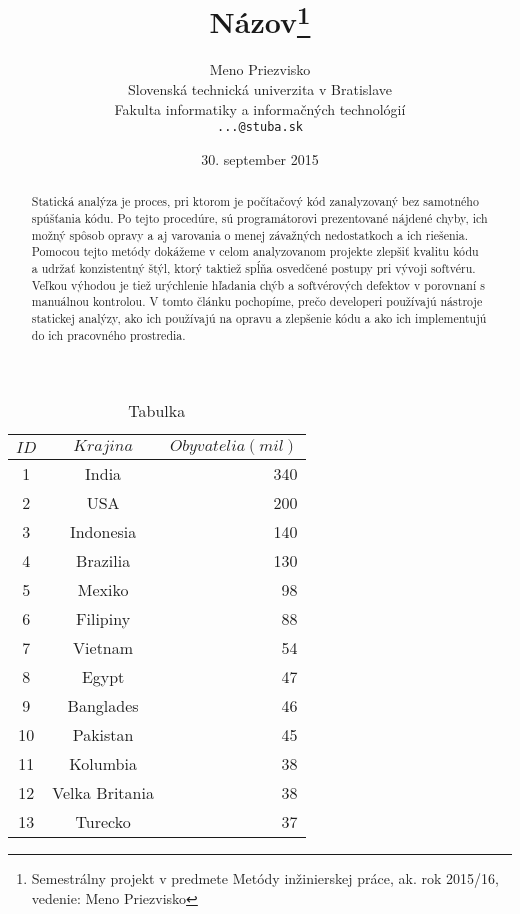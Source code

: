 \documentclass[10pt,twoside,slovak,a4paper]{article}
\title{Názov\thanks{Semestrálny projekt v predmete Metódy inžinierskej práce, ak. rok 2015/16, vedenie: Meno Priezvisko}} %
\author{Meno Priezvisko\\[2pt]
	{\small Slovenská technická univerzita v Bratislave}\\
	{\small Fakulta informatiky a informačných technológií}\\
	{\small \texttt{...@stuba.sk}}
	}
\date{\small 30. september 2015} %
\begin{document}
\maketitle

\begin{abstract}
	Statická analýza je proces, pri ktorom je počítačový kód zanalyzovaný bez samotného spúšťania kódu.
	Po tejto procedúre, sú programátorovi prezentované nájdené chyby, ich možný spôsob opravy a aj varovania
	o menej závažných nedostatkoch a ich riešenia. Pomocou tejto metódy dokážeme v celom analyzovanom projekte
	zlepšiť kvalitu kódu a udržať konzistentný štýl, ktorý taktiež spĺňa osvedčené postupy pri vývoji softvéru.
	Veľkou výhodou je tiež urýchlenie hľadania chýb a softvérových defektov v porovnaní s manuálnou kontrolou.
	V tomto článku pochopíme, prečo developeri používajú nástroje statickej analýzy, ako ich používajú
	na opravu a zlepšenie kódu a ako ich implementujú do ich pracovného prostredia.~\cite{Main}
\end{abstract}


\pagebreak






\begin{table}
	\begin{center}
		\begin{tabular}{c|c|r}
			$ID$ & $Krajina$      & $Obyvatelia(mil)$ \\
			\hline
			1    & India          & 340               \\
			2    & USA            & 200               \\
			3    & Indonesia      & 140               \\
			4    & Brazilia       & 130               \\
			5    & Mexiko         & 98                \\
			6    & Filipiny       & 88                \\
			7    & Vietnam        & 54                \\
			8    & Egypt          & 47                \\
			9    & Banglades      & 46                \\
			10   & Pakistan       & 45                \\
			11   & Kolumbia       & 38                \\
			12   & Velka Britania & 38                \\
			13   & Turecko        & 37                \\
		\end{tabular}
		\caption{Tabulka}
		\label{tab:Tabulka 1}
	\end{center}
\end{table}





\end{document}
